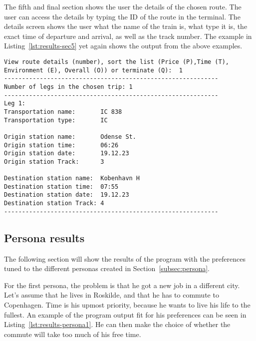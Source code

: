 The fifth and final section shows the user the details of the chosen route.
The user can access the details by typing the ID of the route in the terminal.
The details screen shows the user what the name of the train is, what type it is, the exact time of departure and
arrival, as well as the track number.
The example in Listing~\ref{lst:results-sec5} yet again shows the output from the above examples.

\begin{lstlisting}[label={lst:results-sec5}, caption={Route details output.}, captionpos=b, language={}]
View route details (number), sort the list (Price (P),Time (T), Environment (E), Overall (O)) or terminate (Q):  1
------------------------------------------------------------
Number of legs in the chosen trip: 1
------------------------------------------------------------
Leg 1:
Transportation name:       IC 838
Transportation type:       IC

Origin station name:       Odense St.
Origin station time:       06:26
Origin station date:       19.12.23
Origin station Track:      3

Destination station name:  Kobenhavn H
Destination station time:  07:55
Destination station date:  19.12.23
Destination station Track: 4
------------------------------------------------------------
\end{lstlisting}


\subsection{Persona results}\label{subsec:persona-results}

The following section will show the results of the program with the preferences tuned to the different personas created
in Section~\ref{subsec:persona}.

For the first persona, the problem is that he got a new job in a different city.
Let's assume that he lives in Roskilde, and that he has to commute to Copenhagen.
Time is his upmost priority, because he wants to live his life to the fullest.
An example of the program output fit for his preferences can be seen in Listing~\ref{lst:results-persona1}.
He can then make the choice of whether the commute will take too much of his free time.

